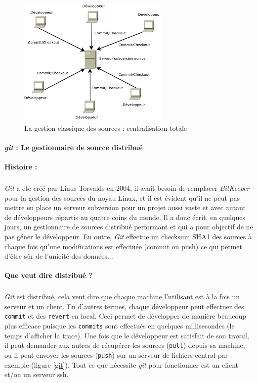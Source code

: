 \begin{figure}[H]
\begin{center}
        \includegraphics[width=0.65\textwidth]{./schema/svn.png}
\caption{La gestion classique des sources : centralisation totale }
\label{svn}
\end{center}
\end{figure}


\label{gitPar}
\paragraph{\textit{git} : Le gestionnaire de source distribué\\~\\Histoire :}
\subparagraph{}
\textit{Git} a été créé par Linus Torvalds en 2004, il avait besoin de remplacer \textit{BitKeeper} pour la gestion des sources du noyau Linux, et il est évident qu'il ne peut pas mettre en place un serveur subversion pour un projet aussi vaste et avec autant de développeurs répartis au quatre coins du monde. Il a donc écrit, en quelques jours, un gestionnaire de sources distribué performant et qui a pour objectif de ne pas géner le développeur. En outre, \textit{Git} effectue un checksum SHA1 des sources à chaque fois qu'une modifications est effectuée (commit ou push) ce qui permet d'être sûr de l'unicité des données...

\paragraph{Que veut dire distribué ?} 
\subparagraph{}
\textit{Git} est distribué, cela veut dire que chaque machine l'utilisant est à la fois un serveur et un client. En d'autres termes, chaque développeur peut effectuer des \verb|commit| et des \verb|revert| en local. Ceci permet de développer de manière beaucoup plus efficace puisque les \verb|commits| sont effectués en quelques millisecondes (le temps d'afficher la trace). Une fois que le développeur est satisfait de son travail, il peut demander aux autres de récupérer les sources (\verb|pull|)  depuis sa machine, ou il peut  envoyer les sources (\verb|push|) sur un serveur de fichiers central par exemple (figure \ref{git}). Tout ce que nécessite \textit{git} pour fonctionner est un client et/ou un serveur ssh.


